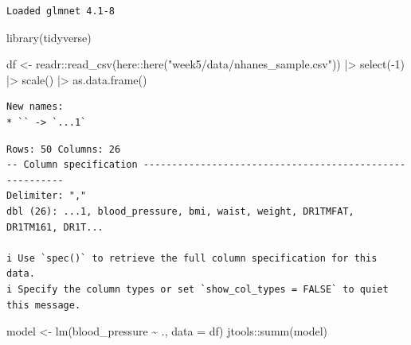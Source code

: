 \documentclass[
  letterpaper,
  DIV=11,
  numbers=noendperiod]{scrreport}
\newenvironment{Shaded}{\begin{snugshade}}{\end{snugshade}}
\newcommand{\AttributeTok}[1]{\textcolor[rgb]{0.40,0.45,0.13}{#1}}
\newcommand{\DecValTok}[1]{\textcolor[rgb]{0.68,0.00,0.00}{#1}}
\newcommand{\FunctionTok}[1]{\textcolor[rgb]{0.28,0.35,0.67}{#1}}
\newcommand{\NormalTok}[1]{\textcolor[rgb]{0.00,0.23,0.31}{#1}}
\newcommand{\OtherTok}[1]{\textcolor[rgb]{0.00,0.23,0.31}{#1}}
\newcommand{\SpecialCharTok}[1]{\textcolor[rgb]{0.37,0.37,0.37}{#1}}
\newcommand{\StringTok}[1]{\textcolor[rgb]{0.13,0.47,0.30}{#1}}
\begin{document}
\begin{verbatim}
Loaded glmnet 4.1-8
\end{verbatim}

\begin{Shaded}
\begin{Highlighting}[]
\FunctionTok{library}\NormalTok{(tidyverse)}

\NormalTok{df }\OtherTok{\textless{}{-}}\NormalTok{ readr}\SpecialCharTok{::}\FunctionTok{read\_csv}\NormalTok{(here}\SpecialCharTok{::}\FunctionTok{here}\NormalTok{(}\StringTok{"week5/data/nhanes\_sample.csv"}\NormalTok{)) }\SpecialCharTok{|\textgreater{}} 
  \FunctionTok{select}\NormalTok{(}\SpecialCharTok{{-}}\DecValTok{1}\NormalTok{) }\SpecialCharTok{|\textgreater{}} \FunctionTok{scale}\NormalTok{() }\SpecialCharTok{|\textgreater{}} \FunctionTok{as.data.frame}\NormalTok{() }
\end{Highlighting}
\end{Shaded}

\begin{verbatim}
New names:
* `` -> `...1`
\end{verbatim}

\begin{verbatim}
Rows: 50 Columns: 26
-- Column specification --------------------------------------------------------
Delimiter: ","
dbl (26): ...1, blood_pressure, bmi, waist, weight, DR1TMFAT, DR1TM161, DR1T...

i Use `spec()` to retrieve the full column specification for this data.
i Specify the column types or set `show_col_types = FALSE` to quiet this message.
\end{verbatim}

\begin{Shaded}
\begin{Highlighting}[]
\NormalTok{model }\OtherTok{\textless{}{-}} \FunctionTok{lm}\NormalTok{(blood\_pressure }\SpecialCharTok{\textasciitilde{}}\NormalTok{ ., }\AttributeTok{data =}\NormalTok{ df)}
\NormalTok{jtools}\SpecialCharTok{::}\FunctionTok{summ}\NormalTok{(model)}
\end{Highlighting}
\end{Shaded}
\end{document}
